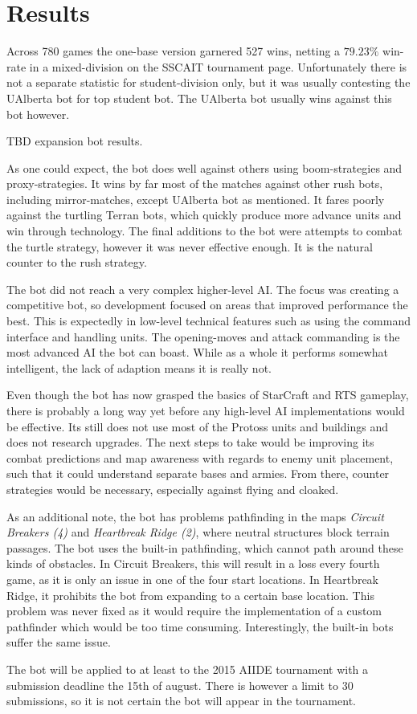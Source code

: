 \chapter{Results}
Across 780 games the one-base version garnered 527 wins, netting a $79.23\%$ win-rate in a mixed-division on the SSCAIT tournament page. Unfortunately there is not a separate statistic for student-division only, but it was usually contesting the UAlberta bot for top student bot. The UAlberta bot usually wins against this bot however.

TBD expansion bot results.

As one could expect, the bot does well against others using boom-strategies and proxy-strategies. It wins by far most of the matches against other rush bots, including mirror-matches, except UAlberta bot as mentioned. It fares poorly against the turtling Terran bots, which quickly produce more advance units and win through technology. The final additions to the bot were attempts to combat the turtle strategy, however it was never effective enough. It is the natural counter to the rush strategy.

The bot did not reach a very complex higher-level AI. The focus was creating a competitive bot, so development focused on areas that improved performance the best. This is expectedly in low-level technical features such as using the command interface and handling units. The opening-moves and attack commanding is the most advanced AI the bot can boast.  While as a whole it performs somewhat intelligent, the lack of adaption means it is really not.

Even though the bot has now grasped the basics of StarCraft and RTS gameplay, there is probably a long way yet before any high-level AI implementations would be effective. Its still does not use most of the Protoss units and buildings and does not research upgrades. The next steps to take would be improving its combat predictions and map awareness with regards to enemy unit placement, such that it could understand separate bases and armies. From there, counter strategies would be necessary, especially against flying and cloaked.

As an additional note, the bot has problems pathfinding in the maps \emph{Circuit Breakers (4)} and \emph{Heartbreak Ridge (2)}, where neutral structures block terrain passages. The bot uses the built-in pathfinding, which cannot path around these kinds of obstacles. In Circuit Breakers, this will result in a loss every fourth game, as it is only an issue in one of the four start locations. In Heartbreak Ridge, it prohibits the bot from expanding to a certain base location. This problem was never fixed as it would require the implementation of a custom pathfinder which would be too time consuming. Interestingly, the built-in bots suffer the same issue.

The bot will be applied to at least to the 2015 AIIDE tournament with a submission deadline the 15th of august. There is however a limit to 30 submissions, so it is not certain the bot will appear in the tournament.